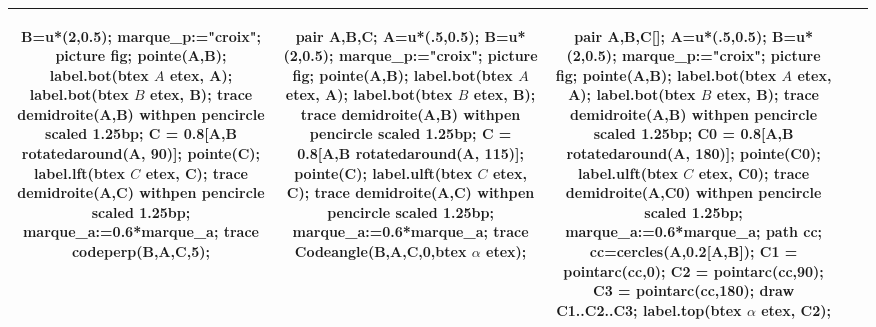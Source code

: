 \begin{changemargin}{0mm}{-25mm}
\begin{definition}
{\begin{tabular}{|*5{c|}}
\begin{Geometrie}[CoinHD={(2.5u,2.5u)}]
            B=u*(2,0.5);
            marque_p:="croix";
            picture fig;
            pointe(A,B);
            label.bot(btex $A$ etex, A);
            label.bot(btex $B$ etex, B);
            trace demidroite(A,B) withpen pencircle scaled 1.25bp;
            C = 0.8[A,B rotatedaround(A, 90)];
            pointe(C);
            label.lft(btex $C$ etex, C);
            trace demidroite(A,C) withpen pencircle scaled 1.25bp;
            marque_a:=0.6*marque_a;
            trace codeperp(B,A,C,5);
        \end{Geometrie}
        &
        \begin{Geometrie}[CoinBG={(-u,0)},CoinHD={(2.5u,2.5u)}]            
            pair A,B,C;
            A=u*(.5,0.5);
            B=u*(2,0.5);
            marque_p:="croix";
            picture fig;
            pointe(A,B);
            label.bot(btex $A$ etex, A);
            label.bot(btex $B$ etex, B);
            trace demidroite(A,B) withpen pencircle scaled 1.25bp;
            C = 0.8[A,B rotatedaround(A, 115)];
            pointe(C);
            label.ulft(btex $C$ etex, C);
            trace demidroite(A,C) withpen pencircle scaled 1.25bp;
            marque_a:=0.6*marque_a;
            trace Codeangle(B,A,C,0,btex $\alpha$ etex);
        \end{Geometrie}
        &
        \begin{Geometrie}[CoinBG={(-u,0)},CoinHD={(2.5u,2.5u)}]            
            pair A,B,C[];
            A=u*(.5,0.5);
            B=u*(2,0.5);
            marque_p:="croix";
            picture fig;
            pointe(A,B);
            label.bot(btex $A$ etex, A);
            label.bot(btex $B$ etex, B);
            trace demidroite(A,B) withpen pencircle scaled 1.25bp;
            C0 = 0.8[A,B rotatedaround(A, 180)];
            pointe(C0);
            label.ulft(btex $C$ etex, C0);
            trace demidroite(A,C0) withpen pencircle scaled 1.25bp;
            marque_a:=0.6*marque_a;
            path cc;
            cc=cercles(A,0.2[A,B]);
            C1 = pointarc(cc,0);
            C2 = pointarc(cc,90);
            C3 = pointarc(cc,180);
            draw C1..C2..C3;
            label.top(btex $\alpha$ etex, C2);
        \end{Geometrie}\\\hline
    \end{tabular}
    }
\end{definition}
\end{changemargin}

